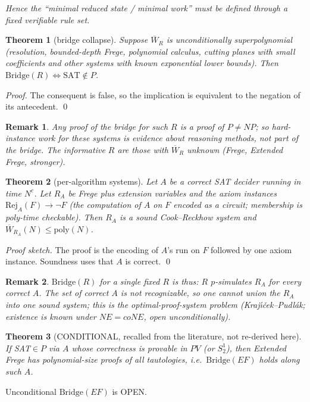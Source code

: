 \documentclass{article}\usepackage{amsmath,amssymb,amsthm}
\newtheorem{thm}{Theorem}\newtheorem{rem}{Remark}
\newcommand{\W}{\overline W}\newcommand{\UNSAT}{\mathrm{UNSAT}}
\begin{document}
\emph{Hence the ``minimal reduced state / minimal work'' must be defined through a fixed verifiable rule set.}

\begin{thm}[bridge collapse] Suppose $\W_R$ is unconditionally superpolynomial (resolution, bounded-depth Frege, polynomial calculus, cutting planes with small coefficients and other systems with known exponential lower bounds). Then $\mathrm{Bridge}(R)\iff \mathrm{SAT}\notin P$.
\end{thm}
\emph{Proof.} The consequent is false, so the implication is equivalent to the negation of its antecedent. \qed

\begin{rem} Any proof of the bridge for such $R$ is a proof of $P\ne NP$; so hard-instance work for these systems is evidence about reasoning methods, not part of the bridge. The informative $R$ are those with $\W_R$ unknown (Frege, Extended Frege, stronger).\end{rem}

\begin{thm}[per-algorithm systems] Let $A$ be a correct SAT decider running in time $N^c$. Let $R_A$ be Frege plus extension variables and the axiom instances $\mathrm{Rej}_A(F)\to\neg F$ (the computation of $A$ on $F$ encoded as a circuit; membership is poly-time checkable). Then $R_A$ is a sound Cook--Reckhow system and $\W_{R_A}(N)\le \mathrm{poly}(N)$.
\end{thm}
\emph{Proof sketch.} The proof is the encoding of $A$'s run on $F$ followed by one axiom instance. Soundness uses that $A$ is correct. \qed

\begin{rem} $\mathrm{Bridge}(R)$ for a single fixed $R$ is thus: $R$ $p$-simulates $R_A$ for every correct $A$. The set of correct $A$ is not recognizable, so one cannot union the $R_A$ into one sound system; this is the optimal-proof-system problem (Kraj\'{\i}\v{c}ek--Pudl\'ak; existence is known under $NE=coNE$, open unconditionally).\end{rem}

\begin{thm}[CONDITIONAL, recalled from the literature, not re-derived here] If SAT$\in P$ via $A$ whose correctness is provable in $PV$ (or $S^1_2$), then Extended Frege has polynomial-size proofs of all tautologies, i.e.\ $\mathrm{Bridge}(EF)$ holds along such $A$. \end{thm}
Unconditional $\mathrm{Bridge}(EF)$ is OPEN.
\end{document}
